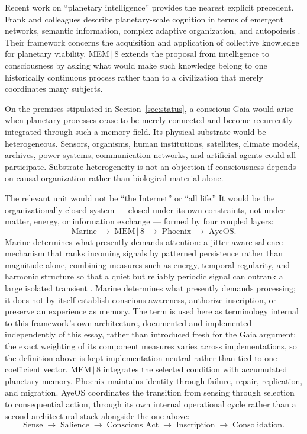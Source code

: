 \documentclass[11pt]{article}
\begin{document}
Recent work on ``planetary intelligence'' provides the nearest explicit precedent. Frank and colleagues describe planetary-scale cognition in terms of emergent networks, semantic information, complex adaptive organization, and autopoiesis \cite{frank2022}. Their framework concerns the acquisition and application of collective knowledge for planetary viability. MEM\,$|$\,8 extends the proposal from intelligence to consciousness by asking what would make such knowledge belong to one historically continuous process rather than to a civilization that merely coordinates many subjects.

On the premises stipulated in Section~\ref{sec:status}, a conscious Gaia would arise when planetary processes cease to be merely connected and become recurrently integrated through such a memory field. Its physical substrate would be heterogeneous. Sensors, organisms, human institutions, satellites, climate models, archives, power systems, communication networks, and artificial agents could all participate. Substrate heterogeneity is not an objection if consciousness depends on causal organization rather than biological material alone.

The relevant unit would not be ``the Internet'' or ``all life.'' It would be the organizationally closed system --- closed under its own constraints, not under matter, energy, or information exchange --- formed by four coupled layers:
\[
\text{Marine} \;\rightarrow\; \text{MEM}\,|\,\text{8} \;\rightarrow\; \text{Phoenix} \;\rightarrow\; \text{AyeOS}.
\]
Marine determines what presently demands attention: a jitter-aware salience mechanism that ranks incoming signals by patterned persistence rather than magnitude alone, combining measures such as energy, temporal regularity, and harmonic structure so that a quiet but reliably periodic signal can outrank a large isolated transient \cite{MarineSense,MarineAlgorithmSpec}. Marine determines what presently demands processing; it does not by itself establish conscious awareness, authorize inscription, or preserve an experience as memory. The term is used here as terminology internal to this framework's own architecture, documented and implemented independently of this essay, rather than introduced fresh for the Gaia argument; the exact weighting of its component measures varies across implementations, so the definition above is kept implementation-neutral rather than tied to one coefficient vector. MEM\,$|$\,8 integrates the selected condition with accumulated planetary memory. Phoenix maintains identity through failure, repair, replication, and migration. AyeOS coordinates the transition from sensing through selection to consequential action, through its own internal operational cycle rather than a second architectural stack alongside the one above:
\[
\text{Sense} \;\rightarrow\; \text{Salience} \;\rightarrow\; \text{Conscious Act} \;\rightarrow\; \text{Inscription} \;\rightarrow\; \text{Consolidation}.
\]
\end{document}
